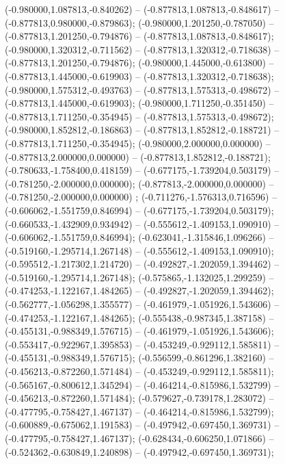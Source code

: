  (-0.980000,1.087813,-0.840262) -- (-0.877813,1.087813,-0.848617) -- (-0.877813,0.980000,-0.879863);
 (-0.980000,1.201250,-0.787050) -- (-0.877813,1.201250,-0.794876) -- (-0.877813,1.087813,-0.848617);
 (-0.980000,1.320312,-0.711562) -- (-0.877813,1.320312,-0.718638) -- (-0.877813,1.201250,-0.794876);
 (-0.980000,1.445000,-0.613800) -- (-0.877813,1.445000,-0.619903) -- (-0.877813,1.320312,-0.718638);
 (-0.980000,1.575312,-0.493763) -- (-0.877813,1.575313,-0.498672) -- (-0.877813,1.445000,-0.619903);
 (-0.980000,1.711250,-0.351450) -- (-0.877813,1.711250,-0.354945) -- (-0.877813,1.575313,-0.498672);
 (-0.980000,1.852812,-0.186863) -- (-0.877813,1.852812,-0.188721) -- (-0.877813,1.711250,-0.354945);
 (-0.980000,2.000000,0.000000) -- (-0.877813,2.000000,0.000000) -- (-0.877813,1.852812,-0.188721);
 (-0.780633,-1.758400,0.418159) -- (-0.677175,-1.739204,0.503179) -- (-0.781250,-2.000000,0.000000);
 (-0.877813,-2.000000,0.000000) -- (-0.781250,-2.000000,0.000000) ;
 (-0.711276,-1.576313,0.716596) -- (-0.606062,-1.551759,0.846994) -- (-0.677175,-1.739204,0.503179);
 (-0.660533,-1.432909,0.934942) -- (-0.555612,-1.409153,1.090910) -- (-0.606062,-1.551759,0.846994);
 (-0.623041,-1.315846,1.096266) -- (-0.519160,-1.295714,1.267148) -- (-0.555612,-1.409153,1.090910);
 (-0.595512,-1.217302,1.214720) -- (-0.492827,-1.202059,1.394462) -- (-0.519160,-1.295714,1.267148);
 (-0.575865,-1.132025,1.299259) -- (-0.474253,-1.122167,1.484265) -- (-0.492827,-1.202059,1.394462);
 (-0.562777,-1.056298,1.355577) -- (-0.461979,-1.051926,1.543606) -- (-0.474253,-1.122167,1.484265);
 (-0.555438,-0.987345,1.387158) -- (-0.455131,-0.988349,1.576715) -- (-0.461979,-1.051926,1.543606);
 (-0.553417,-0.922967,1.395853) -- (-0.453249,-0.929112,1.585811) -- (-0.455131,-0.988349,1.576715);
 (-0.556599,-0.861296,1.382160) -- (-0.456213,-0.872260,1.571484) -- (-0.453249,-0.929112,1.585811);
 (-0.565167,-0.800612,1.345294) -- (-0.464214,-0.815986,1.532799) -- (-0.456213,-0.872260,1.571484);
 (-0.579627,-0.739178,1.283072) -- (-0.477795,-0.758427,1.467137) -- (-0.464214,-0.815986,1.532799);
 (-0.600889,-0.675062,1.191583) -- (-0.497942,-0.697450,1.369731) -- (-0.477795,-0.758427,1.467137);
 (-0.628434,-0.606250,1.071866) -- (-0.524362,-0.630849,1.240898) -- (-0.497942,-0.697450,1.369731);
